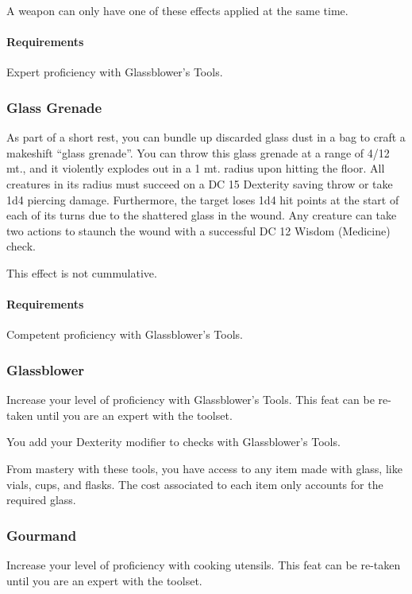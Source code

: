     A weapon can only have one of these effects applied at the same time.
    \paragraph{Requirements} Expert proficiency with Glassblower's Tools.
\subsubsection{Glass Grenade} \label{feat::glassgrenade}
    As part of a short rest, you can bundle up discarded glass dust in a bag to craft a makeshift ``glass grenade''.
    You can throw this glass grenade at a range of 4/12 mt., and it violently explodes out in a 1 mt. radius upon hitting the floor.
    All creatures in its radius must succeed on a DC 15 Dexterity saving throw or take 1d4 piercing damage.
    Furthermore, the target loses 1d4 hit points at the start of each of its turns due to the shattered glass in the wound.
    Any creature can take two actions to staunch the wound with a successful DC 12 Wisdom (Medicine) check.

    This effect is not cummulative.
    \paragraph{Requirements} Competent proficiency with Glassblower's Tools.
\subsubsection{Glassblower} \label{feat::glassblower}
    Increase your level of proficiency with Glassblower's Tools.
    This feat can be re-taken until you are an expert with the toolset.

    You add your Dexterity modifier to checks with Glassblower's Tools.

    From mastery with these tools, you have access to any item made with glass, like vials, cups, and flasks.
    The cost associated to each item only accounts for the required glass.

\subsubsection{Gourmand} \label{feat::gourmand}
    Increase your level of proficiency with cooking utensils.
    This feat can be re-taken until you are an expert with the toolset.

